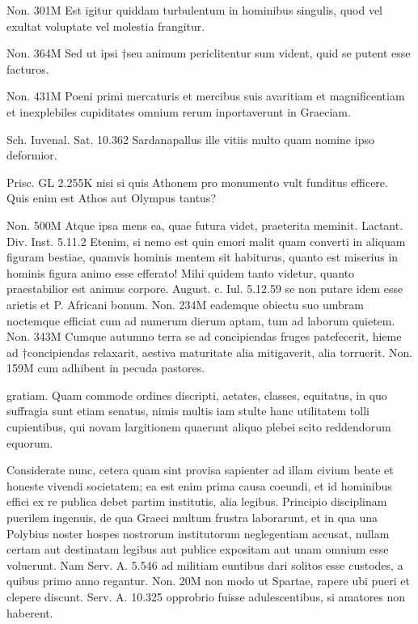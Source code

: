  Non. 301M Est igitur quiddam turbulentum in hominibus singulis, quod vel exultat voluptate vel molestia frangitur.

 Non. 364M Sed ut ipsi †seu animum periclitentur sum vident, quid se putent esse facturos.

 Non. 431M Poeni primi mercaturis et mercibus suis avaritiam et magnificentiam et inexplebiles cupiditates omnium rerum inportaverunt in Graeciam.

 Sch. Iuvenal. Sat. 10.362 Sardanapallus ille vitiis multo quam nomine ipso deformior.

 Prisc. GL 2.255K nisi si quis Athonem pro monumento vult funditus efficere. Quis enim est Athos aut Olympus tantus?

 Non. 500M Atque ipsa mens ea, quae futura videt, praeterita meminit. Lactant. Div. Inst. 5.11.2 Etenim, si nemo est quin emori malit quam converti in aliquam figuram bestiae, quamvis hominis mentem sit habiturus, quanto est miserius in hominis figura animo esse efferato! Mihi quidem tanto videtur, quanto praestabilior est animus corpore. August. c. Iul. 5.12.59 se non putare idem esse arietis et P. Africani bonum. Non. 234M eademque obiectu suo umbram noctemque efficiat cum ad numerum dierum aptam, tum ad laborum quietem. Non. 343M Cumque autumno terra se ad concipiendas fruges patefecerit, hieme ad †concipiendas relaxarit, aestiva maturitate alia mitigaverit, alia torruerit. Non. 159M cum adhibent in pecuda pastores.

 gratiam. Quam commode ordines discripti, aetates, classes, equitatus, in quo suffragia sunt etiam senatus, nimis multis iam stulte hanc utilitatem tolli cupientibus, qui novam largitionem quaerunt aliquo plebei scito reddendorum equorum.

 Considerate nunc, cetera quam sint provisa sapienter ad illam civium beate et honeste vivendi societatem; ea est enim prima causa coeundi, et id hominibus effici ex re publica debet partim institutis, alia legibus. Principio disciplinam puerilem ingenuis, de qua Graeci multum frustra laborarunt, et in qua una Polybius noster hospes nostrorum institutorum neglegentiam accusat, nullam certam aut destinatam legibus aut publice expositam aut unam omnium esse voluerunt. Nam Serv. A. 5.546 ad militiam euntibus dari solitos esse custodes, a quibus primo anno regantur. Non. 20M non modo ut Spartae, rapere ubi pueri et clepere discunt. Serv. A. 10.325 opprobrio fuisse adulescentibus, si amatores non haberent.


